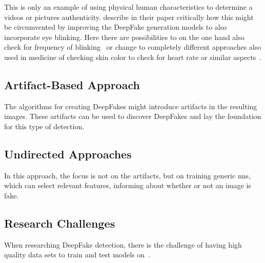 \par
This is only an example of using physical human characteristics to determine a
videos or pictures authenticity. \textcite{li_ictu_2018} describe in 
their paper critically how this might be circumvented by improving the DeepFake
generation models to also incorporate eye blinking. Here there are possibilities
to on the one hand also check for frequency of blinking~\cite{li_ictu_2018} or 
change to completely different approaches also used in medicine of checking skin
color to check for heart rate or similar aspects~\cite{pishori_detecting_2020}.


\subsection{Artifact-Based Approach}
The algorithms for creating DeepFakes might introduce artifacts in the resulting
images. These artifacts can be used to discover DeepFakes and lay the foundation for
this type of detection.

\subsection{Undirected Approaches}
In this approach, the focus is not on the artifacts, but on training generic
\glspl{nn}, which can select relevant features, informing about whether or not
an image is fake. 

\subsection{Research Challenges}
When researching DeepFake detection, there is the challenge of having high
quality data sets to train and test models on~\cite{li_celeb-df_2019}.
